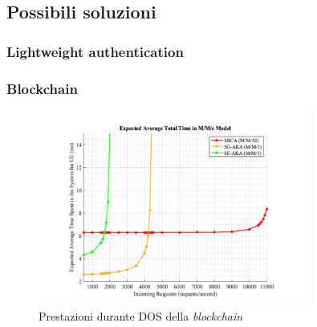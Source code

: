 \clearpage

\subsection{Possibili soluzioni}
\subsubsection{Lightweight authentication}
\cite{5g-lightweight}
\subsubsection{Blockchain}
\begin{figure}[ht]
    \centering
    \includegraphics[width=0.8\textwidth]{images/5g-blockchain-dos.png}
    \caption{Prestazioni durante DOS della \textit{blockchain}\cite{5g-blockchain}}
\end{figure}

\cite{5g-imsi-encryption}
